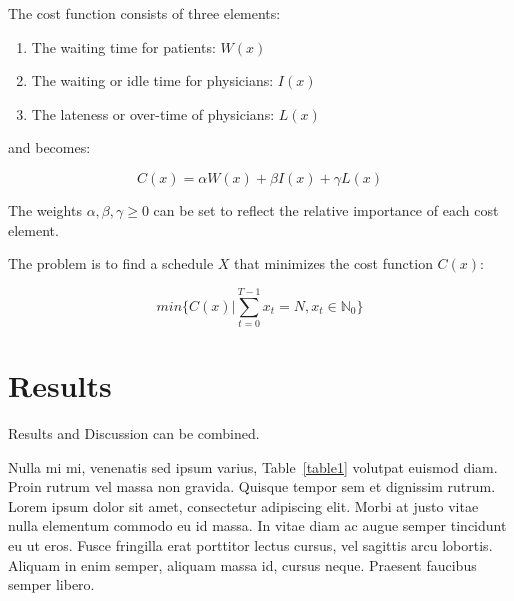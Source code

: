 \documentclass[
  10pt,
  letterpaper,
]{article}
\providecommand{\tightlist}{%
  \setlength{\itemsep}{0pt}\setlength{\parskip}{0pt}}\usepackage{longtable,booktabs,array}
\begin{document}
The cost function consists of three elements:

\begin{enumerate}
\def\labelenumi{\arabic{enumi}.}
\tightlist
\item
  The waiting time for patients: \(W(x)\)
\item
  The waiting or idle time for physicians: \(I(x)\)
\item
  The lateness or over-time of physicians: \(L(x)\)
\end{enumerate}

and becomes:

\[
C(x) = \alpha W(x) + \beta I(x) + \gamma L(x)
\]

The weights \(\alpha, \beta,\gamma \geq0\) can be set to reflect the
relative importance of each cost element.

The problem is to find a schedule \(X\) that minimizes the cost function
\(C(x)\):

\[
min\{C(x)|\displaystyle\sum_{t=0} ^{T-1} x_t = N, x_t \in \mathbb{N}_0\}
\]

\hypertarget{results}{%
\section{Results}\label{results}}

Results and Discussion can be combined.

Nulla mi mi, venenatis sed ipsum varius, Table~\ref{table1} volutpat
euismod diam. Proin rutrum vel massa non gravida. Quisque tempor sem et
dignissim rutrum. Lorem ipsum dolor sit amet, consectetur adipiscing
elit. Morbi at justo vitae nulla elementum commodo eu id massa. In vitae
diam ac augue semper tincidunt eu ut eros. Fusce fringilla erat
porttitor lectus cursus,  vel sagittis arcu lobortis.
Aliquam in enim semper, aliquam massa id, cursus neque. Praesent
faucibus semper libero.
\end{document}

